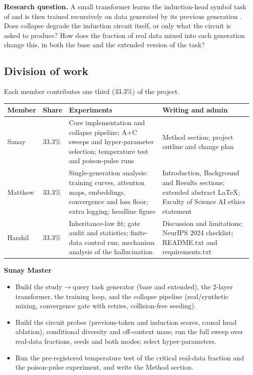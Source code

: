\documentclass[10pt,letterpaper]{article}
\begin{document}
\textbf{Research question.} A small transformer learns the induction-head symbol task of \citet{singh2024needs} and is then trained recursively on data generated by its previous generation \citep{shumailov2024ai}. Does collapse degrade the induction circuit itself, or only what the circuit is asked to produce? How does the fraction of real data mixed into each generation change this, in both the base and the extended version of the task?

\subsection{Division of work}

Each member contributes one third (33.3\%) of the project.

\begin{center}
\small
\begin{tabular}{@{}l l >{\raggedright\arraybackslash}p{} >{\raggedright\arraybackslash}p{}@{}}
\toprule
\textbf{Member} & \textbf{Share} & \textbf{Experiments} & \textbf{Writing and admin} \\
\midrule
Sunay & 33.3\% & Core implementation and collapse pipeline; A+C sweeps and hyper-parameter selection; temperature test and poison-pulse runs & Method section; project outline and change plan \\
\addlinespace
Matthew & 33.3\% & Single-generation analysis: training curves, attention maps, embeddings, convergence and loss floor; extra logging; headline figure & Introduction, Background and Results sections; extended abstract LaTeX; Faculty of Science AI ethics statement \\
\addlinespace
Harshil & 33.3\% & Inheritance-law fit; gate audit and statistics; finite-data control run; mechanism analysis of the hallucination & Discussion and limitations; NeurIPS 2024 checklist; README.txt and requirements.txt \\
\bottomrule
\end{tabular}
\end{center}

\textbf{Sunay Master}
\begin{itemize}
    \item Build the study$\rightarrow$query task generator (base and extended), the 2-layer transformer, the training loop, and the collapse pipeline (real/synthetic mixing, convergence gate with retries, collision-free seeding).
    \item Build the circuit probes (previous-token and induction scores, causal head ablation), conditional diversity and off-context mass; run the full sweep over real-data fractions, seeds and both modes; select hyper-parameters.
    \item Run the pre-registered temperature test of the critical real-data fraction and the poison-pulse experiment, and write the Method section.
\end{itemize}
\end{document}
